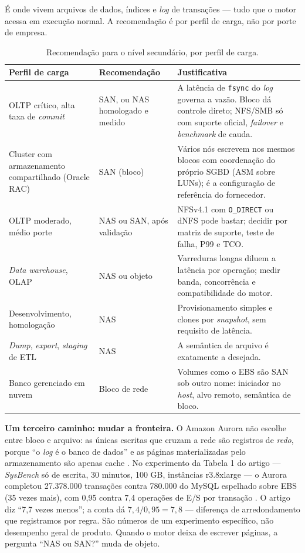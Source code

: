\documentclass[11pt,a4paper]{article}
\begin{document}
É onde vivem arquivos de dados, índices e \textit{log} de transações --- tudo que o motor acessa em
execução normal. A recomendação é por perfil de carga, não por porte de empresa.

\begin{table}[H]
\centering
\caption{Recomendação para o nível secundário, por perfil de carga.}
\label{tab:recsec}
{\footnotesize
\begin{tabular}{@{}L{3.6cm}L{2.6cm}L{8.6cm}@{}}
\toprule
\textbf{Perfil de carga} & \textbf{Recomendação} & \textbf{Justificativa} \\
\midrule
OLTP crítico, alta taxa de \textit{commit} & SAN, ou NAS homologado e medido & A latência de \texttt{fsync} do \textit{log} governa a vazão. Bloco dá controle direto; NFS/SMB só com suporte oficial, \textit{failover} e \textit{benchmark} de cauda. \\
Cluster com armazenamento compartilhado (Oracle RAC) & SAN (bloco) & Vários nós escrevem nos mesmos blocos com coordenação do próprio SGBD (ASM sobre LUNs); é a configuração de referência do fornecedor. \\
OLTP moderado, médio porte & NAS ou SAN, após validação & NFSv4.1 com \texttt{O\_DIRECT} ou dNFS \cite{oracledn} pode bastar; decidir por matriz de suporte, teste de falha, P99 e TCO. \\
\textit{Data warehouse}, OLAP & NAS ou objeto & Varreduras longas diluem a latência por operação; medir banda, concorrência e compatibilidade do motor. \\
Desenvolvimento, homologação & NAS & Provisionamento simples e clones por \textit{snapshot}, sem requisito de latência. \\
\textit{Dump}, \textit{export}, \textit{staging} de ETL & NAS & A semântica de arquivo é exatamente a desejada. \\
Banco gerenciado em nuvem & Bloco de rede & Volumes como o EBS são SAN sob outro nome: iniciador no \textit{host}, alvo remoto, semântica de bloco. \\
\bottomrule
\end{tabular}}
\end{table}

\textbf{Um terceiro caminho: mudar a fronteira.} O Amazon Aurora não escolhe entre bloco e arquivo: as
únicas escritas que cruzam a rede são registros de \textit{redo}, porque ``o \textit{log} é o banco de
dados'' e as páginas materializadas pelo armazenamento são apenas cache \cite{aurora2017}. No experimento
da Tabela 1 do artigo --- \textit{SysBench} só de escrita, 30 minutos, 100 GB, instâncias r3.8xlarge --- o
Aurora completou 27.378.000 transações contra 780.000 do MySQL espelhado sobre EBS (35 vezes mais), com
0,95 contra 7,4 operações de E/S por transação \cite{aurora2017}. O artigo diz ``7,7 vezes menos''; a
conta dá $7{,}4 / 0{,}95 = 7{,}8$ --- diferença de arredondamento que registramos por regra. São números
de um experimento específico, não desempenho geral de produto. Quando o motor deixa de escrever páginas, a
pergunta ``NAS ou SAN?'' muda de objeto.
\end{document}

